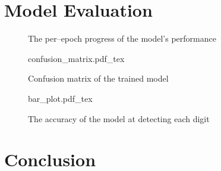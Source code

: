 \documentclass[conference]{IEEEtran}
\begin{document}
\section{Model Evaluation}
\begin{figure}[!htp]
    \centering
    \scriptsize
    \caption{The per--epoch progress of the model's performance }
\end{figure}
\begin{figure}[!htp]
    \centering
    \def\svgwidth{\columnwidth}
    \scriptsize
    {confusion_matrix.pdf_tex}
    \caption{Confusion matrix of the trained model}\label{fig:confusion_matrix}
\end{figure}
\blindtext
\begin{figure}[!htp]
    \centering
    \def\svgwidth{\columnwidth}
    \Huge
    {bar_plot.pdf_tex}
    \caption{The accuracy of the model at detecting each digit}\label{fig:confusion_matrix_normalized}
\end{figure}

\section{Conclusion}
\blindtext



\end{document}
